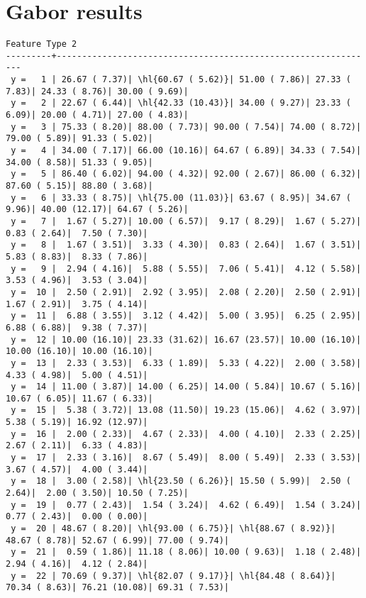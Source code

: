 \documentclass[10pt]{article}
\newcommand{\hl}[1]{\textbf{\textcolor{red}{#1}}}
\begin{document}
\clearpage
\section*{Gabor results}
\begin{Verbatim}[fontsize=\small, commandchars=\\\{\}]
            Feature Type 2 
---------+---------------------------------------------------------------
 y =   1 | 26.67 ( 7.37)| \hl{60.67 ( 5.62)}| 51.00 ( 7.86)| 27.33 ( 7.83)| 24.33 ( 8.76)| 30.00 ( 9.69)|
 y =   2 | 22.67 ( 6.44)| \hl{42.33 (10.43)}| 34.00 ( 9.27)| 23.33 ( 6.09)| 20.00 ( 4.71)| 27.00 ( 4.83)|
 y =   3 | 75.33 ( 8.20)| 88.00 ( 7.73)| 90.00 ( 7.54)| 74.00 ( 8.72)| 79.00 ( 5.89)| 91.33 ( 5.02)|
 y =   4 | 34.00 ( 7.17)| 66.00 (10.16)| 64.67 ( 6.89)| 34.33 ( 7.54)| 34.00 ( 8.58)| 51.33 ( 9.05)|
 y =   5 | 86.40 ( 6.02)| 94.00 ( 4.32)| 92.00 ( 2.67)| 86.00 ( 6.32)| 87.60 ( 5.15)| 88.80 ( 3.68)|
 y =   6 | 33.33 ( 8.75)| \hl{75.00 (11.03)}| 63.67 ( 8.95)| 34.67 ( 9.96)| 40.00 (12.17)| 64.67 ( 5.26)|
 y =   7 |  1.67 ( 5.27)| 10.00 ( 6.57)|  9.17 ( 8.29)|  1.67 ( 5.27)|  0.83 ( 2.64)|  7.50 ( 7.30)|
 y =   8 |  1.67 ( 3.51)|  3.33 ( 4.30)|  0.83 ( 2.64)|  1.67 ( 3.51)|  5.83 ( 8.83)|  8.33 ( 7.86)|
 y =   9 |  2.94 ( 4.16)|  5.88 ( 5.55)|  7.06 ( 5.41)|  4.12 ( 5.58)|  3.53 ( 4.96)|  3.53 ( 3.04)|
 y =  10 |  2.50 ( 2.91)|  2.92 ( 3.95)|  2.08 ( 2.20)|  2.50 ( 2.91)|  1.67 ( 2.91)|  3.75 ( 4.14)|
 y =  11 |  6.88 ( 3.55)|  3.12 ( 4.42)|  5.00 ( 3.95)|  6.25 ( 2.95)|  6.88 ( 6.88)|  9.38 ( 7.37)|
 y =  12 | 10.00 (16.10)| 23.33 (31.62)| 16.67 (23.57)| 10.00 (16.10)| 10.00 (16.10)| 10.00 (16.10)|
 y =  13 |  2.33 ( 3.53)|  6.33 ( 1.89)|  5.33 ( 4.22)|  2.00 ( 3.58)|  4.33 ( 4.98)|  5.00 ( 4.51)|
 y =  14 | 11.00 ( 3.87)| 14.00 ( 6.25)| 14.00 ( 5.84)| 10.67 ( 5.16)| 10.67 ( 6.05)| 11.67 ( 6.33)|
 y =  15 |  5.38 ( 3.72)| 13.08 (11.50)| 19.23 (15.06)|  4.62 ( 3.97)|  5.38 ( 5.19)| 16.92 (12.97)|
 y =  16 |  2.00 ( 2.33)|  4.67 ( 2.33)|  4.00 ( 4.10)|  2.33 ( 2.25)|  2.67 ( 2.11)|  6.33 ( 4.83)|
 y =  17 |  2.33 ( 3.16)|  8.67 ( 5.49)|  8.00 ( 5.49)|  2.33 ( 3.53)|  3.67 ( 4.57)|  4.00 ( 3.44)|
 y =  18 |  3.00 ( 2.58)| \hl{23.50 ( 6.26)}| 15.50 ( 5.99)|  2.50 ( 2.64)|  2.00 ( 3.50)| 10.50 ( 7.25)|
 y =  19 |  0.77 ( 2.43)|  1.54 ( 3.24)|  4.62 ( 6.49)|  1.54 ( 3.24)|  0.77 ( 2.43)|  0.00 ( 0.00)|
 y =  20 | 48.67 ( 8.20)| \hl{93.00 ( 6.75)}| \hl{88.67 ( 8.92)}| 48.67 ( 8.78)| 52.67 ( 6.99)| 77.00 ( 9.74)|
 y =  21 |  0.59 ( 1.86)| 11.18 ( 8.06)| 10.00 ( 9.63)|  1.18 ( 2.48)|  2.94 ( 4.16)|  4.12 ( 2.84)|
 y =  22 | 70.69 ( 9.37)| \hl{82.07 ( 9.17)}| \hl{84.48 ( 8.64)}| 70.34 ( 8.63)| 76.21 (10.08)| 69.31 ( 7.53)|

\end{Verbatim}
\end{document}
